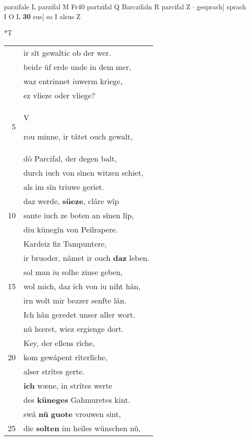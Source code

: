 \documentclass[8pt,a4paper,notitlepage]{article}
\begin{document}
\begin{table}[ht]
\begin{minipage}[t]{0.5\linewidth}
parzifale L parzifal M Fr40 partzifal Q Barczifaln R parcifal Z  $\cdot$ gesprach] sprach I O L \textbf{30} sus] so I alsus Z \newline
\end{minipage}
\hspace{0.5cm}
\begin{minipage}[t]{0.5\linewidth}
\small
\begin{center}*T
\end{center}
\begin{tabular}{rl}
 & ir sît gewaltic ob der wer.\\ 
 & beid\textit{e} ûf erde unde in dem mer,\\ 
 & waz entrinnet iuwerm kriege,\\ 
 & ez vlieze oder vliege?\\ 
5 & \begin{large}V\end{large}rou minne, ir tâtet ouch gewalt,\\ 
 & dô Parcifal, der degen balt,\\ 
 & durch iuch von sînen witzen schiet,\\ 
 & als im sîn triuwe geriet.\\ 
 & daz werde, \textbf{süeze}, clâre wîp\\ 
10 & sante iuch ze boten an sînen lîp,\\ 
 & diu künegîn von Peilrapere.\\ 
 & Kardeiz fiz Tampuntere,\\ 
 & ir bruoder, nâmet ir ouch \textbf{daz} leben.\\ 
 & sol man iu solhe zinse geben,\\ 
15 & wol mich, daz ich von iu niht hân,\\ 
 & irn wolt mir bezzer senfte lân.\\ 
 & Ich hân geredet unser aller wort.\\ 
 & nû hœret, wiez ergienge dort.\\ 
 & Key, der ellens rîche,\\ 
20 & kom gewâpent rîterlîche,\\ 
 & alser strîtes gerte.\\ 
 & \textbf{ich} wæne, in strîtes werte\\ 
 & des \textbf{küneges} Gahmuretes kint.\\ 
 & swâ \textbf{nû} \textbf{guote} vrouwen sint,\\ 
25 & die \textbf{solten} im heiles wünschen nû,\\ 

\end{tabular}
\end{minipage}
\end{table}
\end{document}
